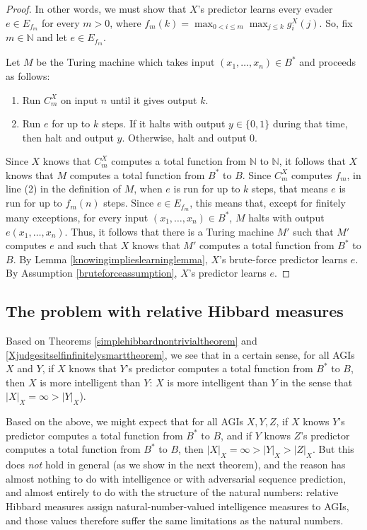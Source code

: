 \documentclass{article}
\begin{document}
\begin{proof}
    In other words, we must show that $X$'s predictor learns every
    evader $e\in E_{f_m}$ for every $m>0$, where
    $f_m(k)=\max_{0<i\leq m}\max_{j\leq k}g^X_i(j)$.
    So, fix $m\in\mathbb N$ and let $e\in E_{f_m}$.

    Let $M$ be the Turing machine which takes input $(x_1,\ldots,x_n)\in B^*$
    and proceeds as follows:
    \begin{enumerate}
        \item
        Run $C^X_m$ on input $n$ until it gives output $k$.
        \item
        Run $e$ for up to $k$ steps. If it halts with output $y\in\{0,1\}$ during that
        time, then halt and output $y$. Otherwise, halt and output $0$.
    \end{enumerate}
    Since $X$ knows that $C^X_m$ computes a total function from $\mathbb N$ to $\mathbb N$,
    it follows that $X$ knows that $M$ computes a total function from $B^*$ to $B$.
    Since $C^X_m$ computes $f_m$,
    in line (2) in the definition of $M$, when $e$ is run for
    up to $k$ steps, that means $e$ is run for up to $f_m(n)$ steps.
    Since $e\in E_{f_m}$, this means that, except for finitely many exceptions,
    for every input $(x_1,\ldots,x_n)\in B^*$, $M$ halts with output
    $e(x_1,\ldots,x_n)$. Thus, it follows that there is a Turing machine $M'$
    such that $M'$ computes $e$ and such that $X$ knows that $M'$ computes a total
    function from $B^*$ to $B$. By Lemma \ref{knowingimplieslearninglemma},
    $X$'s brute-force predictor learns $e$. By Assumption \ref{bruteforceassumption},
    $X$'s predictor learns $e$.
\end{proof}

\subsection{The problem with relative Hibbard measures}
\label{problemwithsimplehibbardsection}

Based on Theorems \ref{simplehibbardnontrivialtheorem}
and \ref{Xjudgesitselfinfinitelysmarttheorem},
we see that in a certain sense, for all AGIs $X$ and $Y$,
if $X$ knows that $Y$'s predictor computes a total function from $B^*$ to $B$,
then $X$ is more intelligent than $Y$: $X$ is more intelligent
than $Y$ in the sense that $|X|_X=\infty>|Y|_X$).

Based on the above, we might expect that for all AGIs $X,Y,Z$, if $X$ knows
$Y$'s predictor computes a total function from $B^*$ to $B$, and if $Y$
knows $Z$'s predictor computes a total function from $B^*$ to $B$,
then $|X|_X=\infty>|Y|_X>|Z|_X$. But this does \emph{not} hold in general
(as we show in the next theorem),
and the reason has almost nothing to do with intelligence or with adversarial
sequence prediction, and almost entirely to do with the structure of the natural
numbers: relative Hibbard measures assign natural-number-valued intelligence
measures to AGIs, and those values therefore suffer the same limitations as the
natural numbers.
\end{document}
